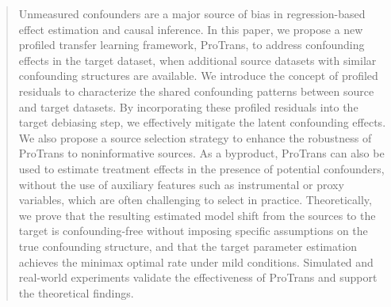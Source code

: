 \documentclass[12pt]{article}
\begin{document}
\bigskip
\begin{abstract}
Unmeasured confounders are a major source of bias in regression-based effect estimation and causal inference. In this paper, we propose a new profiled transfer learning framework, ProTrans, to address confounding effects in the target dataset, when additional source datasets with similar confounding structures are available. We introduce the concept of profiled residuals to characterize the shared confounding patterns between source and target datasets. By incorporating these profiled residuals into the target debiasing step, we effectively mitigate the latent confounding effects. We also propose a source selection strategy to enhance the robustness of ProTrans to noninformative sources. As a byproduct, ProTrans can also be used to estimate treatment effects in the presence of potential confounders, without the use of auxiliary features such as instrumental or proxy variables, which are often challenging to select in practice. Theoretically, we prove that the resulting estimated model shift from the sources to the target is confounding-free without imposing specific assumptions on the true confounding structure, and that the target parameter estimation achieves the minimax optimal rate under mild conditions. Simulated and real-world experiments validate the effectiveness of ProTrans and support the theoretical findings.
\end{abstract}
\end{document}

